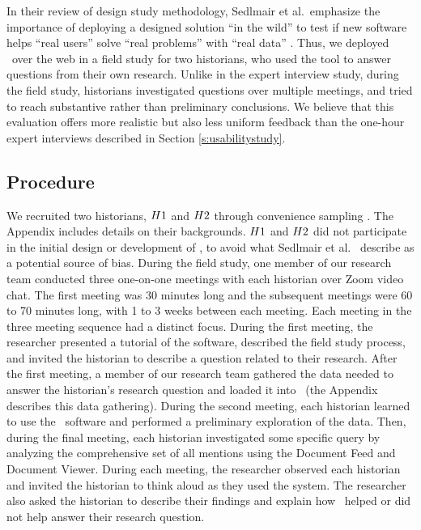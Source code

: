 In their review of design study methodology, Sedlmair et al.\ emphasize the importance of deploying a designed solution ``in the wild'' to test if new software helps ``real users'' solve ``real problems'' with ``real data'' \cite{Sedlmair}. 
Thus, we deployed \ours~over the web in a field study for two historians, who used the tool to answer questions from their own research. 
Unlike in the expert interview study, during the field study, historians investigated questions over multiple meetings, and tried to reach substantive rather than preliminary conclusions.
We believe that this evaluation offers more realistic but also less uniform feedback than the one-hour expert interviews described in Section \ref{s:usabilitystudy}.


\subsection{Procedure}

We recruited two historians, $H1$ and $H2$ through convenience sampling \cite{given_sage_2008}. 
The Appendix includes details on their backgrounds. $H1$ and $H2$ did not participate in the initial design or development of \ours, to avoid what Sedlmair et al.\ \cite{Sedlmair} describe as a potential source of bias.
During the field study, one member of our research team conducted three one-on-one meetings with each historian over Zoom video chat. 
The first meeting was 30 minutes long and the subsequent meetings were 60 to 70 minutes long, with 1 to 3 weeks between each meeting.
Each meeting in the three meeting sequence had a distinct focus. 
During the first meeting, the researcher presented a tutorial of the software, described the field study process, and invited the historian to describe a question related to their research. 
After the first meeting, a member of our research team gathered the data needed to answer the historian's research question and loaded it into \ours~(the Appendix describes this data gathering). 
During the second meeting, each historian learned to use the \ours~software and performed a preliminary exploration of the data. 
Then, during the final meeting, each historian investigated some specific query by analyzing the comprehensive set of all mentions using the Document Feed and Document Viewer. 
During each meeting, the researcher observed each historian and invited the historian to think aloud \cite{thinkaloud} as they used the system. 
The researcher also asked the historian to describe their findings and explain how \ours~helped or did not help answer their research question.

